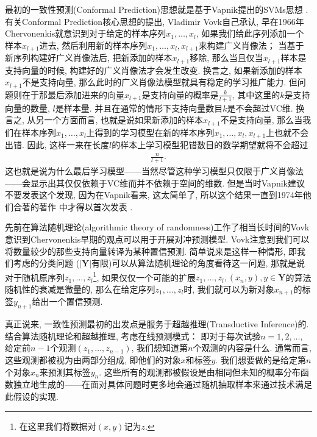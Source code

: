最初的一致性预测(Conformal Prediction)思想就是基于Vapnik提出的SVMs思想 \citep{gammerman1998}. 有关Conformal Prediction核心思想的提出, Vladimir Vovk自己承认\citep{vovk-harris-Gammerman2015}, 早在1966年Chervonenkis就意识到对于给定的样本序列$x_{1}, \ldots, x_{l}$, 如果我们给此序列添加一个样本$x_{l+1}$进去, 然后利用新的样本序列$x_{1}, \ldots, x_{l}, x_{l+1}$来构建广义肖像法\citep{vapnik1963}； 当基于新序列构建好广义肖像法后, 把新添加的样本$x_{l+1}$移除, 那么当且仅当$x_{l+1}$样本是支持向量的时候, 构建好的广义肖像法才会发生改变. 换言之, 如果新添加的样本$x_{l+1}$不是支持向量, 那么此时的广义肖像法模型就具有稳定的学习推广能力. 但问题则在于那最后添加进来的向量$x_{l+1}$是支持向量的概率是$\frac{k}{l+1}$, 其中这里的$k$是支持向量的数量, $l$是样本量. 并且在通常的情形下支持向量数目$k$是不会超过VC维. 换言之, 从另一个方面而言, 也就是说如果新添加的样本$x_{l+1}$不是支持向量, 那么当我们在样本序列$x_{1}, \ldots, x_{l}$上得到的学习模型在新的样本序列$x_{1}, \ldots, x_{l}, x_{l+1}$上也就不会出错. 因此, 这样一来在长度$l$的样本上学习模型犯错数目的数学期望就将不会超过
\begin{align*}
\frac{n}{l+1}.
\end{align*}
这也就是说为什么最后学习模型——当然尽管这种学习模型只仅限于广义肖像法——会显示出其仅仅依赖于VC维而并不依赖于空间的维数. 但是当时Vapnik建议不要发表这个发现, 因为在Vapnik看来, 这太简单了, 所以这个结果一直到1974年他们合著的著作 \citep{vapnik1974} 中才得以首次发表 \citep{Alexey2015}. 

先前在算法随机理论(algorithmic theory of randomness)工作了相当长时间的Vovk意识到Chervonenkis早期的观点可以用于开展对冲预测模型. Vovk注意到我们可以将数量较少的那些支持向量转译为某种置信预测. 简单说来是这样一种情形, 即我们考虑的分类问题 ($|\mathbf{Y}|$有限)可以从算法随机理论的角度看待这一问题, 那就是说对于随机原序列$z_{1}, \ldots, z_{l}$\footnote{在这里我们将数据对$(x, y)$记为$z$.}, 如果仅仅一个可能的扩展$z_{1}, \ldots, z_{l}, (x_{n}, y), y \in \mathbf{Y}$的算法随机性的衰减是微量的, 那么在给定序列$z_{1}, \ldots, z_{l}$时, 我们就可以为新对象$x_{n+1}$的标签$y_{n+1}$给出一个置信预测.

真正说来, 一致性预测最初的出发点是服务于超越推理(Transductive Inference)的. 结合算法随机理论和超越推理, 考虑在线预测模式： 即对于每次试验$n = 1, 2, \ldots$, 给定前$n-1$个观测$(z_{1}, \ldots, z_{n-1})$, 我们想知道第$n$个观测的内容是什么. 通常而言, 这些观测都被视为由两部分组成, 即他们的对象$x$和标签$y$. 我们想要做的是给定第$n$个对象$x_{n}$来预测其标签$y_{n}$. 这些所有的观测都被假设是由相同但未知的概率分布函数独立地生成的——在面对具体问题时更多地会通过随机抽取样本来通过技术满足此假设的实现. 

